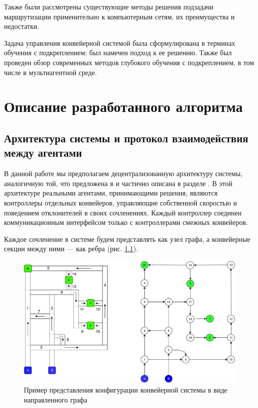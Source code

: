 \documentclass[specification,annotation,times]{itmo-student-thesis}
\theoremstyle{definition}
\begin{document}
Также были рассмотрены существующие методы решения подзадачи маршрутизации
применительно к компьютерным сетям, их преимущества и недостатки.

Задача управления конвейерной системой была сформулирована в терминах обучения с
подкреплением; был намечен подход к ее решению. Также был проведен обзор
современных методов глубокого обучения с подкреплением, в том числе в
мультиагентной среде.

\finishrelatedwork

\chapter{Описание разработанного алгоритма}

\section{Архитектура системы и протокол взаимодействия между агентами}

В данной работе мы предполагаем децентрализованную архитектуру системы,
аналогичную той, что предложена в \cite{black2009intelligent,
  vyatkin-controllers} и частично описана в разделе \label{vyatkin-method}. В
этой архитектуре реальными агентами, принимающими решения, являются контроллеры
отдельных конвейеров, управляющие собственной скоростью и поведением
отклонителей в своих сочленениях. Каждый контроллер соединен коммуникационным
интерфейсом только с контроллерами смежных конвейеров.

Каждое сочленение в системе будем представлять как узел графа, а конвейерные
секции между ними --- как ребра (рис. \ref{conveyor-graph-representation}).

\begin{figure}[!h]
  \caption{Пример представления конфигурации конвейерной системы в виде
    направленного графа}\label{conveyor-graph-representation}
  \centering
  \includegraphics[width=\textwidth]{conveyor-1-illustration-2}
\end{figure}
\end{document}
